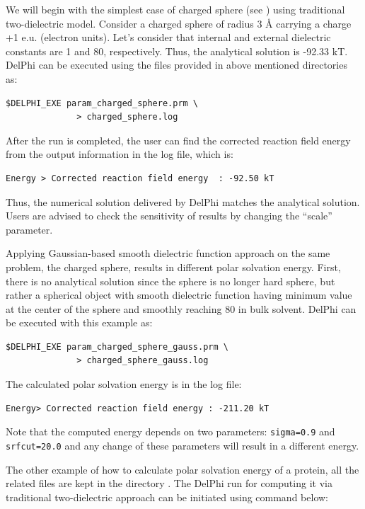 \documentclass[9pt,tutorial]{livecoms}
\newcommand*\ttvar[1]{\texttt{\expandafter\dottvar\detokenize{#1}\relax}}
\newcommand*\dottvar[1]{\ifx\relax#1\else
  \expandafter\ifx\string_#1\string_\allowbreak\else#1\fi
  \expandafter\dottvar\fi}
\begin{document}
We will begin with the simplest case of charged sphere (see \ttvar{Example_3.1.1/Ex1/}) using traditional two-dielectric model. Consider a charged sphere of radius 3 Å carrying a charge +1 e.u. (electron units). Let’s consider that internal and external dielectric constants are 1 and 80, respectively. Thus, the analytical solution is -92.33 kT. DelPhi can be executed using the files provided in above mentioned directories as:

\begin{verbatim}
$DELPHI_EXE param_charged_sphere.prm \
              > charged_sphere.log
\end{verbatim}

After the run is completed, the user can find the corrected reaction field energy from the output information in the log file, which is: 
\begin{verbatim}
Energy > Corrected reaction field energy  : -92.50 kT
\end{verbatim}

Thus, the numerical solution delivered by DelPhi matches the analytical solution. Users are advised to check the sensitivity of results by changing the “scale” parameter. 

Applying Gaussian-based smooth dielectric function approach on the same problem, the charged sphere, results in different polar solvation energy. First, there is no analytical solution since the sphere is no longer hard sphere, but rather a spherical object with smooth dielectric function having minimum value at the center of the sphere and smoothly reaching 80 in bulk solvent. DelPhi can be executed with this example as:

\begin{verbatim}
$DELPHI_EXE param_charged_sphere_gauss.prm \
              > charged_sphere_gauss.log
\end{verbatim}

The calculated polar solvation energy is in the log file:

\begin{verbatim}
Energy> Corrected reaction field energy : -211.20 kT
\end{verbatim}

Note that the computed energy depends on two parameters: \texttt{sigma=0.9} and \texttt{srfcut=20.0} and any change of these parameters will result in a different energy. 

The other example of how to calculate polar solvation energy of a protein, all the related files are kept in the directory \ttvar{Example_3.1.1/Ex2/}. The DelPhi run for computing it via traditional two-dielectric approach can be initiated using command below:
\end{document}
